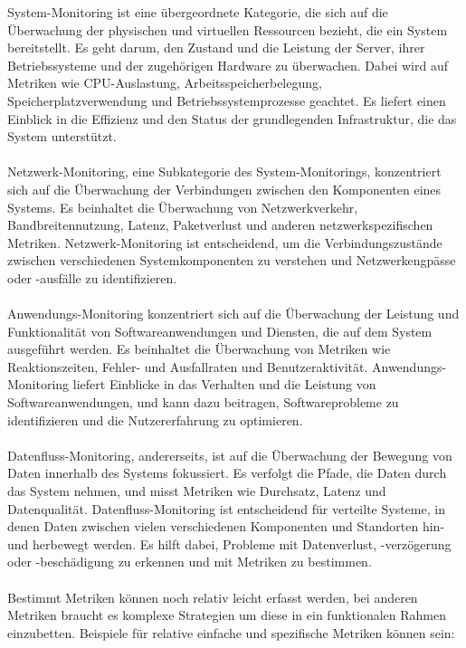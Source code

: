 System-Monitoring ist eine übergeordnete Kategorie, die sich auf die Überwachung der physischen und virtuellen Ressourcen bezieht, die ein System bereitstellt. Es geht darum, den Zustand und die Leistung der Server, ihrer Betriebssysteme und der zugehörigen Hardware zu überwachen. Dabei wird auf Metriken wie CPU-Auslastung, Arbeitsspeicherbelegung, Speicherplatzverwendung und Betriebssystemprozesse geachtet. Es liefert einen Einblick in die Effizienz und den Status der grundlegenden Infrastruktur, die das System unterstützt.
\\\\
Netzwerk-Monitoring, eine Subkategorie des System-Monitorings, konzentriert sich auf die Überwachung der Verbindungen zwischen den Komponenten eines Systems. Es beinhaltet die Überwachung von Netzwerkverkehr, Bandbreitennutzung, Latenz, Paketverlust und anderen netzwerkspezifischen Metriken. Netzwerk-Monitoring ist entscheidend, um die Verbindungszustände zwischen verschiedenen Systemkomponenten zu verstehen und Netzwerkengpässe oder -ausfälle zu identifizieren.
\\\\
Anwendungs-Monitoring konzentriert sich auf die Überwachung der Leistung und Funktionalität von Softwareanwendungen und Diensten, die auf dem System ausgeführt werden. Es beinhaltet die Überwachung von Metriken wie Reaktionszeiten, Fehler- und Ausfallraten und Benutzeraktivität. Anwendungs-Monitoring liefert Einblicke in das Verhalten und die Leistung von Softwareanwendungen, und kann dazu beitragen, Softwareprobleme zu identifizieren und die Nutzererfahrung zu optimieren.
\\\\
Datenfluss-Monitoring, andererseits, ist auf die Überwachung der Bewegung von Daten innerhalb des Systems fokussiert. Es verfolgt die Pfade, die Daten durch das System nehmen, und misst Metriken wie Durchsatz, Latenz und Datenqualität. Datenfluss-Monitoring ist entscheidend für verteilte Systeme, in denen Daten zwischen vielen verschiedenen Komponenten und Standorten hin- und herbewegt werden. Es hilft dabei, Probleme mit Datenverlust, -verzögerung oder -beschädigung zu erkennen und mit Metriken zu bestimmen.
\\\\
Bestimmt Metriken können noch relativ leicht erfasst werden, bei anderen Metriken braucht es komplexe Strategien um diese in ein funktionalen Rahmen einzubetten. Beispiele für relative einfache und  spezifische Metriken können sein: 
